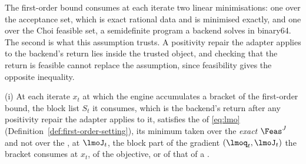 
The first-order bound consumes at each iterate two linear minimisations: one
over the acceptance set, which is exact rational data and is minimised
exactly, and one over the Choi feasible set, a semidefinite program a backend
solves in binary64. The second is what this assumption trusts. A positivity
repair the adapter applies to the backend's return lies inside the trusted
object, and checking that the return is feasible cannot replace the
assumption, since feasibility gives the opposite inequality.

\begin{assumption}\label{ass:lmo}
(i) At each iterate $x_t$ at which the engine accumulates a bracket of the
first-order bound, the block list $S_t$ it consumes, which is the backend's
return after any positivity repair the adapter applies to it, satisfies the
 of \eqref{eq:lmo}
(Definition~\ref{def:first-order-setting}), its minimum taken over the
\emph{exact} $\Feas^{J}$ and not over the , at
$\lmoJ_t$, the block part of the gradient $(\lmoq_t,\lmoJ_t)$ the bracket
consumes at $x_t$, of the objective, or of that of a .
\end{assumption}
